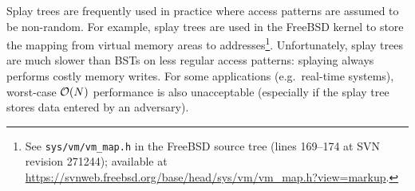 Splay trees are frequently used in practice where access patterns are assumed
to be non-random. For example, splay trees are used in the FreeBSD kernel
to store the mapping from virtual memory areas to
addresses\footnote{
	See \texttt{sys/vm/vm\_map.h} in the FreeBSD source tree (lines 169--174
	at SVN revision 271244); available at
	\url{https://svnweb.freebsd.org/base/head/sys/vm/vm\_map.h?view=markup}.
}.
Unfortunately, splay trees are much slower than BSTs on less
regular access patterns: splaying always performs costly memory writes.
For some applications (e.g.\ real-time systems), worst-case $\mathcal{O}(N)$ performance
is also unacceptable (especially if the splay tree stores data entered by
an adversary).
